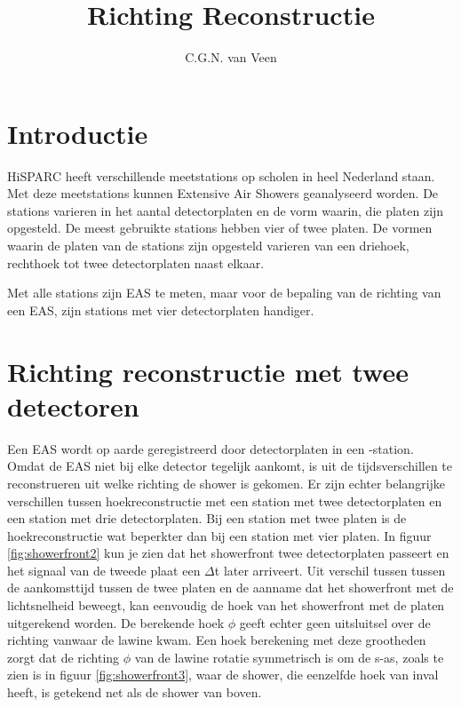 



\title{Richting Reconstructie}
\author{C.G.N. van Veen} 
\date{}

\maketitle

\section{Introductie}

HiSPARC heeft verschillende meetstations op scholen in heel Nederland staan. 
Met deze meetstations kunnen Extensive Air Showers geanalyseerd worden.
De stations varieren in het aantal detectorplaten en de vorm waarin,
die platen zijn opgesteld. De meest gebruikte stations hebben vier of twee platen.
De vormen waarin de platen van de stations zijn opgesteld varieren van een driehoek,
rechthoek tot twee detectorplaten naast elkaar.

Met alle stations zijn EAS te meten, maar voor de bepaling van de richting van een EAS, zijn 
stations met vier detectorplaten handiger.
  


\section{Richting reconstructie met twee detectoren}

Een EAS wordt op aarde geregistreerd door detectorplaten in een \hisparc-station. 
Omdat de EAS niet bij elke detector tegelijk aankomt, is uit de tijdsverschillen 
te reconstrueren uit welke richting de shower is gekomen. 
Er zijn echter belangrijke verschillen tussen hoekreconstructie met een station met twee detectorplaten en een station met drie detectorplaten. 
Bij een station met twee platen is de hoekreconstructie wat beperkter dan bij een station met vier platen.
In figuur \ref{fig:showerfront2} kun je zien dat het showerfront twee detectorplaten passeert en het signaal van de tweede plaat  een $\Delta$t later arriveert. 
Uit verschil tussen tussen de aankomsttijd tussen de twee platen en de aanname dat het showerfront met de lichtsnelheid beweegt,
 kan eenvoudig de hoek van het showerfront met de platen uitgerekend worden. De berekende hoek $\phi$ geeft echter geen uitsluitsel over de richting vanwaar de lawine kwam.
 Een hoek berekening met deze grootheden zorgt dat de richting $\phi$ van de lawine rotatie symmetrisch is om de s-as, zoals te zien is in figuur \ref{fig:showerfront3}, 
waar de shower, die eenzelfde hoek van inval heeft,  is getekend net als de shower van boven. 

